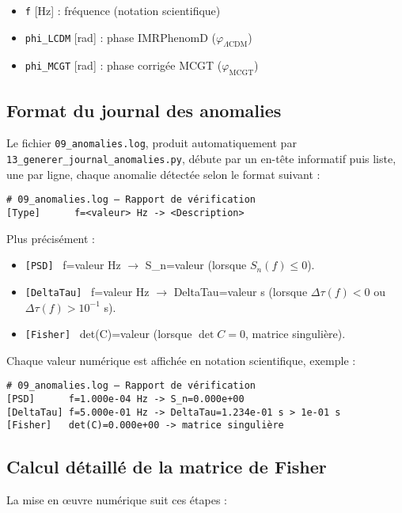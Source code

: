 \begin{itemize}
  \item \texttt{f} [Hz]         : fréquence (notation scientifique)
  \item \texttt{phi\_LCDM} [rad] : phase IMRPhenomD (\(\varphi_{\Lambda\mathrm{CDM}}\))
  \item \texttt{phi\_MCGT} [rad] : phase corrigée MCGT (\(\varphi_{\mathrm{MCGT}}\))
\end{itemize}

\subsection{Format du journal des anomalies}
Le fichier \texttt{09\_anomalies.log}, produit automatiquement par \texttt{13\_generer\_journal\_anomalies.py}, débute par un en-tête informatif puis liste, une par ligne, chaque anomalie détectée selon le format suivant :

\begin{verbatim}
# 09_anomalies.log – Rapport de vérification
[Type]      f=<valeur> Hz -> <Description>
\end{verbatim}

\noindent Plus précisément :
\begin{itemize}
  \item \texttt{[PSD]}      \, f=\<valeur\> Hz \(\to\) S\_n=\<valeur\>  
        (lorsque \(S_{n}(f)\le 0\)).  
  \item \texttt{[DeltaTau]} \, f=\<valeur\> Hz \(\to\) DeltaTau=\<valeur\> s  
        (lorsque \(\Delta\tau(f)<0\) ou \(\Delta\tau(f)>10^{-1}\) s).  
  \item \texttt{[Fisher]}   \, det(C)=\<valeur\>  
        (lorsque \(\det C=0\), matrice singulière).
\end{itemize}

Chaque valeur numérique est affichée en notation scientifique, exemple :

\begin{verbatim}
# 09_anomalies.log – Rapport de vérification
[PSD]      f=1.000e-04 Hz -> S_n=0.000e+00
[DeltaTau] f=5.000e-01 Hz -> DeltaTau=1.234e-01 s > 1e-01 s
[Fisher]   det(C)=0.000e+00 -> matrice singulière
\end{verbatim}

\subsection{Calcul détaillé de la matrice de Fisher}
\label{subsec:details-fisher}
La mise en œuvre numérique suit ces étapes :

